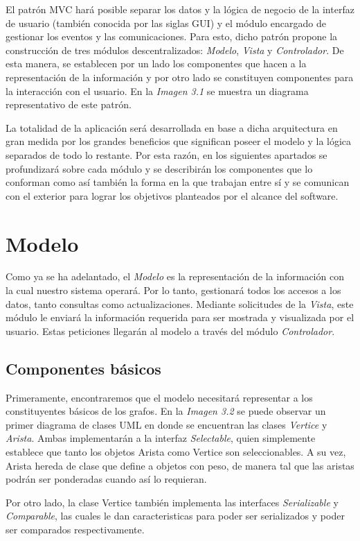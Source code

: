 \documentclass{book}
\begin{document}
El patrón MVC hará posible separar los datos y la lógica de negocio de la interfaz de usuario (también conocida por las siglas GUI) y el módulo encargado de gestionar los eventos y las comunicaciones. Para esto, dicho patrón propone la construcción de tres módulos descentralizados: \textit{Modelo}, \textit{Vista} y \textit{Controlador}. De esta manera, se establecen por un lado los componentes que hacen a la representación de la información y por otro lado se constituyen componentes para la interacción con el usuario. En la \textit{Imagen 3.1} se muestra un diagrama representativo de este patrón.
\par
La totalidad de la aplicación será desarrollada en base a dicha arquitectura en gran medida por los grandes beneficios que significan poseer el modelo y la lógica separados de todo lo restante. Por esta razón, en los siguientes apartados se profundizará sobre cada módulo y se describirán los componentes que lo conforman como así también la forma en la que trabajan entre sí y se comunican con el exterior para lograr los objetivos planteados por el alcance del software.
\newpage


\section{Modelo}

Como ya se ha adelantado, el \textit{Modelo} es la representación de la información con la cual nuestro sistema operará. Por lo tanto, gestionará todos los accesos a los datos, tanto consultas como actualizaciones. Mediante solicitudes de la \textit{Vista}, este módulo le enviará la información requerida para ser mostrada y visualizada por el usuario. Estas peticiones llegarán al modelo a través del módulo \textit{Controlador}.
\bigskip


\subsection{Componentes básicos}

Primeramente, encontraremos que el modelo necesitará representar a los constituyentes básicos de los grafos. En la \textit{Imagen 3.2} se puede observar un primer diagrama de clases UML en donde se encuentran las clases \textit{Vertice} y \textit{Arista}. Ambas implementarán a la interfaz \textit{Selectable}, quien simplemente establece que tanto los objetos Arista como Vertice son seleccionables. A su vez, Arista hereda de clase que define a objetos con peso, de manera tal que las aristas podrán ser ponderadas cuando así lo requieran.
\par
Por otro lado, la clase Vertice también implementa las interfaces \textit{Serializable} y \textit{Comparable}, las cuales le dan caracteristicas para poder ser serializados y poder ser comparados respectivamente.
\bigskip\bigskip
\end{document}
